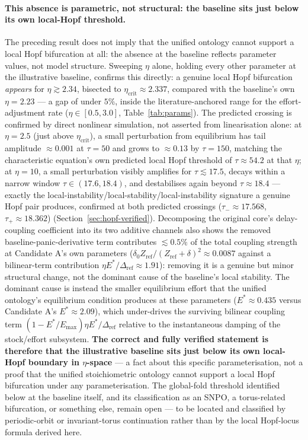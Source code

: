 \documentclass[twocolumn,10pt]{article}
\begin{document}
\paragraph{This absence is parametric, not structural: the baseline sits just below its own local-Hopf threshold.} The preceding result does not imply that the unified ontology cannot support a local Hopf bifurcation at all: the absence at the baseline reflects parameter values, not model structure. Sweeping $\eta$ alone, holding every other parameter at the illustrative baseline, confirms this directly: a genuine local Hopf bifurcation \emph{appears} for $\eta\gtrsim2.34$, bisected to $\eta_{\text{crit}}\approx2.337$, compared with the baseline's own $\eta=2.23$ --- a gap of under $5\%$, inside the literature-anchored range for the effort-adjustment rate ($\eta\in[0.5,3.0]$, Table~\ref{tab:params}). The predicted crossing is confirmed by direct nonlinear simulation, not asserted from linearisation alone: at $\eta=2.5$ (just above $\eta_{\text{crit}}$), a small perturbation from equilibrium has tail amplitude $\approx0.001$ at $\tau=50$ and grows to $\approx0.13$ by $\tau=150$, matching the characteristic equation's own predicted local Hopf threshold of $\tau\approx54.2$ at that $\eta$; at $\eta=10$, a small perturbation visibly amplifies for $\tau\lesssim17.5$, decays within a narrow window $\tau\in(17.6,18.4)$, and destabilises again beyond $\tau\approx18.4$ --- exactly the local-instability/local-stability/local-instability signature a genuine Hopf pair produces, confirmed at both predicted crossings ($\tau_-\approx17.568$, $\tau_+\approx18.362$) (Section~\ref{sec:hopf-verified}). Decomposing the original core's delay-coupling coefficient into its two additive channels also shows the removed baseline-panic-derivative term contributes $\lesssim0.5\%$ of the total coupling strength at Candidate A's own parameters ($\delta_0Z_{\text{ref}}/(Z_{\text{ref}}+\delta)^2\approx0.0087$ against a bilinear-term contribution $\eta E^*/\Delta_{\text{ref}}\approx1.91$): removing it is a genuine but minor structural change, not the dominant cause of the baseline's local stability. The dominant cause is instead the smaller equilibrium effort that the unified ontology's equilibrium condition produces at these parameters ($E^*\approx0.435$ versus Candidate A's $E^*\approx2.09$), which under-drives the surviving bilinear coupling term $(1-E^*/E_{\max})\eta E^*/\Delta_{\text{ref}}$ relative to the instantaneous damping of the stock/effort subsystem. \textbf{The correct and fully verified statement is therefore that the illustrative baseline sits just below its own local-Hopf boundary in $\eta$-space} --- a fact about this specific parameterisation, not a proof that the unified stoichiometric ontology cannot support a local Hopf bifurcation under any parameterisation. The global-fold threshold identified below at the baseline itself, and its classification as an SNPO, a torus-related bifurcation, or something else, remain open --- to be located and classified by periodic-orbit or invariant-torus continuation rather than by the local Hopf-locus formula derived here.
\end{document}
